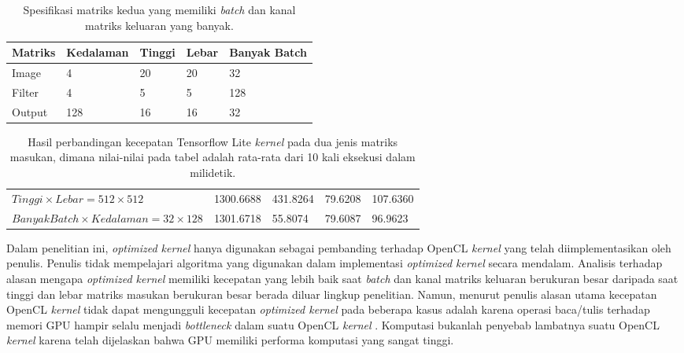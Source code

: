 \begin{table}
	\centering
	\caption{Spesifikasi matriks kedua yang memiliki \textit{batch} dan kanal matriks keluaran yang banyak.}
	\label{tab:hwvsbc2}
\begin{tabular}{|>{\small}L{2.1cm}|>{\small}L{2.1cm}|>{\small}L{2.1cm}|>{\small}L{2.1cm}|>{\small}L{2.4cm}|}
	\hline
	\textbf{Matriks} & \textbf{Kedalaman} & \textbf{Tinggi} & \textbf{Lebar} & \textbf{Banyak Batch} 
		\\
		\hline
		Image & 4 & 20 & 20 & 32
		\\
		\hline
		Filter & 4 & 5 & 5 & 128
		\\
		\hline
		Output & 128 & 16 & 16 & 32
		\\
		\hline
	\end{tabular}
\end{table}

\begin{table}
	\centering
	\caption{Hasil perbandingan kecepatan Tensorflow Lite \textit{kernel} pada dua jenis matriks masukan, dimana nilai-nilai pada tabel adalah rata-rata dari 10 kali eksekusi dalam milidetik.}
	\label{tab:hwvsbcspeed}
\begin{tabular}{|>{\small}R{2.5cm}|>{\small}R{2.1cm}|>{\small}R{2.1cm}|>{\small}R{2.1cm}|>{\small}R{2.4cm}|}
	\hline
	 & 
	 & 
	 & 
	 & 
	 \\
	\hline
		$Tinggi \times Lebar = 512 \times 512$ & 1300.6688 & 431.8264 & 79.6208 & 107.6360
		\\
		\hline
		$Banyak Batch \times Kedalaman = 32 \times 128$ & 1301.6718 & 55.8074 & 79.6087 & 96.9623
		\\
		\hline
	\end{tabular}
\end{table}

Dalam penelitian ini, \textit{optimized kernel} hanya digunakan sebagai pembanding terhadap OpenCL \textit{kernel} yang telah diimplementasikan oleh penulis. Penulis tidak mempelajari algoritma yang digunakan dalam implementasi \textit{optimized kernel} secara mendalam. Analisis terhadap alasan mengapa \textit{optimized kernel} memiliki kecepatan yang lebih baik saat \textit{batch} dan kanal matriks keluaran berukuran besar daripada saat tinggi dan lebar matriks masukan berukuran besar berada diluar lingkup penelitian. Namun, menurut penulis alasan utama kecepatan OpenCL \textit{kernel} tidak dapat mengungguli kecepatan \textit{optimized kernel} pada beberapa kasus adalah karena operasi baca/tulis terhadap memori GPU hampir selalu menjadi \textit{bottleneck} dalam suatu OpenCL \textit{kernel} \cite{adrenoopencl}. Komputasi bukanlah penyebab lambatnya suatu OpenCL \textit{kernel} karena telah dijelaskan bahwa GPU memiliki performa komputasi yang sangat tinggi.

